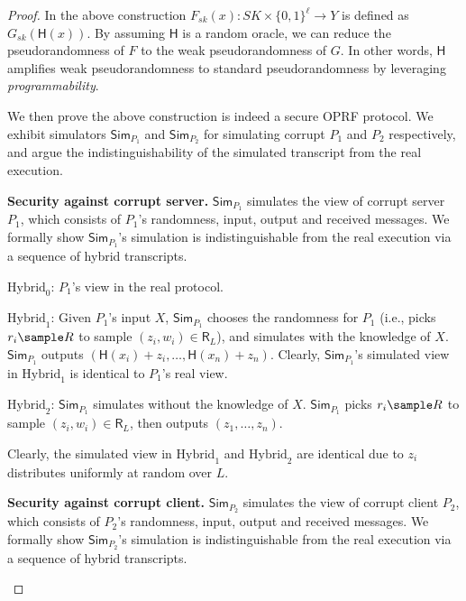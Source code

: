 \documentclass[a4paper,10pt]{article}
\begin{document}
\begin{proof}
In the above construction $F_{sk}(x): SK \times \{0,1\}^\ell \rightarrow Y$ is defined as $G_{sk}(\mathsf{H}(x))$. 
By assuming $\mathsf{H}$ is a random oracle, 
we can reduce the pseudorandomness of $F$ to the weak pseudorandomness of $G$. 
In other words, $\mathsf{H}$ amplifies weak pseudorandomness to standard pseudorandomness 
by leveraging \emph{programmability}. 

We then prove the above construction is indeed a secure OPRF protocol. 
We exhibit simulators $\mathsf{Sim}_{P_1}$ and $\mathsf{Sim}_{P_2}$ for simulating corrupt $P_1$ and $P_2$ respectively, 
and argue the indistinguishability of the simulated transcript from the real execution. 

\begin{trivlist}
\item \textbf{Security against corrupt server.} $\mathsf{Sim}_{P_1}$ simulates the view of corrupt server $P_1$, 
    which consists of $P_1$'s randomness, input, output and received messages.
    We formally show $\mathsf{Sim}_{P_1}$'s simulation is indistinguishable from the real execution 
    via a sequence of hybrid transcripts. 

\item $\text{Hybrid}_0$: $P_1$'s view in the real protocol.

\item $\text{Hybrid}_1$: Given $P_1$'s input $X$, $\mathsf{Sim}_{P_1}$ 
    chooses the randomness for $P_1$ (i.e., picks $r_i \sample R$ to sample $(z_i, w_i) \in \mathsf{R}_L$), 
    and simulates with the knowledge of $X$. 
    $\mathsf{Sim}_{P_1}$ outputs $(\mathsf{H}(x_i)+z_i, \dots, \mathsf{H}(x_n)+z_n)$.      
    Clearly, $\mathsf{Sim}_{P_1}$'s simulated view in $\text{Hybrid}_1$ is identical to $P_1$'s real view. 

\item $\text{Hybrid}_2$: $\mathsf{Sim}_{P_1}$ simulates without the knowledge of $X$. 
    $\mathsf{Sim}_{P_1}$ picks $r_i \sample R$ to sample $(z_i, w_i) \in \mathsf{R}_L$, 
    then outputs $(z_1, \dots, z_n)$.     

Clearly, the simulated view in $\text{Hybrid}_1$ and $\text{Hybrid}_2$ are identical due to $z_i$ 
distributes uniformly at random over $L$. 
\end{trivlist}

\begin{trivlist}
\item \textbf{Security against corrupt client.} $\mathsf{Sim}_{P_2}$ simulates the view of corrupt client $P_2$, 
    which consists of $P_2$'s randomness, input, output and received messages.
    We formally show $\mathsf{Sim}_{P_2}$'s simulation is indistinguishable from the real execution via a sequence 
    of hybrid transcripts. 



\end{trivlist}
\end{proof}
\end{document}
